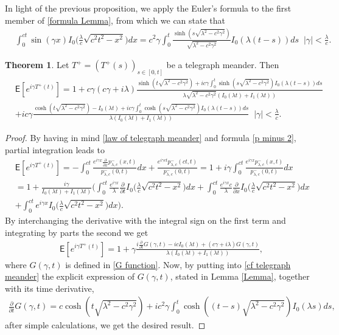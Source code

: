 \documentclass{article}
\theoremstyle{definition}
\newtheorem{theorem}{Theorem}[section]
\numberwithin{equation}{section}
\begin{document}
In light of the previous proposition, we apply the Euler's formula to the first member of \eqref{formula Lemma}, from which we can state that
\begin{align}\label{odd part G function}
&\int_{0}^{ct}\sin(\gamma x)I_0\big(\frac{\lambda}{c}\sqrt{c^2t^2-x^2}\big)dx =  c^2\gamma\int_0^t\frac{\sinh{(s\sqrt{\lambda^2-c^2\gamma^2})}}{\sqrt{\lambda^2-c^2\gamma^2}}I_0(\lambda (t-s))ds \;\; |\gamma| <\frac{\lambda}{c}.
\end{align}
\begin{theorem}
Let $T^+ = (T^+(s))_{s \in [0,t]}$ be a telegraph meander. Then
\begin{align}
&\mathsf{E}[e^{i\gamma T^+(t)}] =1 + c\gamma(c\gamma+i\lambda )\frac{\sinh(t\sqrt{\lambda^2 -c^2 \gamma^2})+ic\gamma\int_0^t\sinh{(s\sqrt{\lambda^2 -c^2 \gamma^2})}I_0(\lambda(t-s))ds}{\lambda\sqrt{\lambda^2 -c^2 \gamma^2}(I_0(\lambda t)+I_1(\lambda t))} \nonumber\\
&+ic\gamma\frac{\cosh(t\sqrt{\lambda^2 -c^2 \gamma^2})-I_0(\lambda t)+ic\gamma\int_0^t\cosh(s\sqrt{\lambda^2 -c^2 \gamma^2})I_0(\lambda(t-s))ds}{\lambda(I_0(\lambda t)+I_1(\lambda t))} \;\;|\gamma| <\frac{\lambda}{c}.
\end{align}
\begin{proof}
By having in mind \eqref{law of telegraph meander} and formula \eqref{p minus 2}, partial integration leads to
\begin{align*}
&\mathsf{E}[e^{i\gamma T^+(t)}] =-\int_0^{ct}\frac{e^{i\gamma x}\frac{\partial}{\partial x}p^{-}_{\lambda,c}(x,t)}{p^{-}_{\lambda,c}(0,t)}dx + \frac{e^{i\gamma ct}p^{-}_{\lambda,c}(ct,t)}{p^{-}_{\lambda,c}(0,t)}= 1 + i\gamma\int_0^{ct} \frac{e^{i\gamma x}p^{-}_{\lambda,c}(x,t)}{p^{-}_{\lambda,c}(0,t)}dx\\
&=1 + \frac{i\gamma}{I_0(\lambda t)+I_1(\lambda t)}\bigg(\int_0^{ct} \frac{e^{i\gamma x}}{\lambda}\frac{\partial}{\partial t}I_0\big(\frac{\lambda}{c}\sqrt{c^2t^2-x^2}\big)dx+\int_0^{ct} \frac{e^{i\gamma x}c}{\lambda}\frac{\partial}{\partial x}I_0\big(\frac{\lambda}{c}\sqrt{c^2t^2-x^2}\big)dx\\&+\int_0^{ct} e^{i\gamma x}I_0\big(\frac{\lambda}{c}\sqrt{c^2t^2-x^2}\big)dx\bigg).
\end{align*}
By interchanging the derivative with the integral sign on the first term and integrating by parts the second we get
\begin{align}\label{cf telegraph meander}
&\mathsf{E}[e^{i\gamma T^+(t)}]=1 + \gamma\frac{i\frac{\partial}{\partial t}G(\gamma,t) -icI_0(\lambda t) +(c\gamma+i\lambda)G(\gamma,t)}{\lambda(I_0(\lambda t)+I_1(\lambda t))},
\end{align}
where $G(\gamma,t)$ is defined in \eqref{G function}. Now, by putting into \eqref{cf telegraph meander} the explicit expression of $G(\gamma,t)$, stated in Lemma \ref{Lemma}, together with its time derivative,
\begin{align*}
\frac{\partial}{\partial t}G(\gamma,t) = c \cosh(t\sqrt{\lambda^2-c^2 \gamma^2}) +ic^2\gamma\int_0^t \cosh((t-s)\sqrt{\lambda^2-c^2 \gamma^2})I_0(\lambda s) ds,
\end{align*}
after simple calculations, we get the desired result. 
\end{proof}
\end{theorem}
\end{document}
